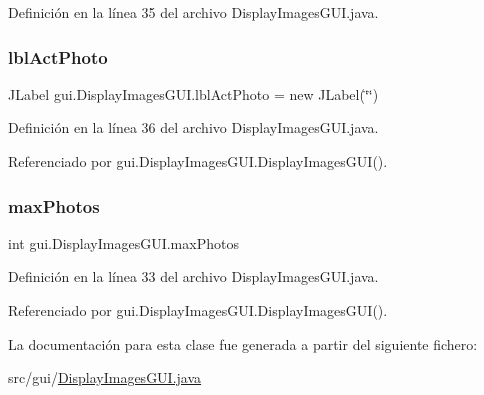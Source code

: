Definición en la línea 35 del archivo Display\+Images\+G\+U\+I.\+java.

\mbox{\label{classgui_1_1_display_images_g_u_i_a07b3c804bf0847f00977fac829fb092e}} 
\subsubsection{\texorpdfstring{lblActPhoto}{lblActPhoto}}
{\footnotesize\ttfamily J\+Label gui.\+Display\+Images\+G\+U\+I.\+lbl\+Act\+Photo = new J\+Label(\char`\"{}\char`\"{})\hspace{0.3cm}{\ttfamily [private]}}



Definición en la línea 36 del archivo Display\+Images\+G\+U\+I.\+java.



Referenciado por gui.\+Display\+Images\+G\+U\+I.\+Display\+Images\+G\+U\+I().

\mbox{\label{classgui_1_1_display_images_g_u_i_a3f6072ee462364a095f2702fbcb14e17}} 
\subsubsection{\texorpdfstring{maxPhotos}{maxPhotos}}
{\footnotesize\ttfamily int gui.\+Display\+Images\+G\+U\+I.\+max\+Photos\hspace{0.3cm}{\ttfamily [private]}}



Definición en la línea 33 del archivo Display\+Images\+G\+U\+I.\+java.



Referenciado por gui.\+Display\+Images\+G\+U\+I.\+Display\+Images\+G\+U\+I().



La documentación para esta clase fue generada a partir del siguiente fichero\+:\begin{DoxyCompactItemize}
\item 
src/gui/\mbox{\hyperlink{_display_images_g_u_i_8java}{Display\+Images\+G\+U\+I.\+java}}\end{DoxyCompactItemize}
